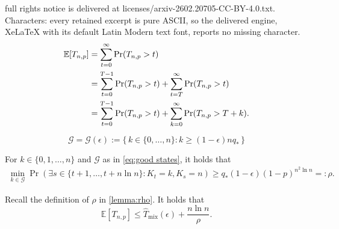 \documentclass[10pt,a4paper]{amsart}
\newcommand{\E}{\mathbb{E}}
\newcommand{\Tmar}{\hat{T}_{\mathrm{mix}}}
\begin{document}
full rights notice is delivered at licenses/arxiv-2602.20705-CC-BY-4.0.txt. Characters: every retained excerpt is pure ASCII, so the delivered engine, XeLaTeX with its default Latin Modern text font, reports no missing character.
\begin{align}
    \E[T_{n,p}] &= \sum_{t=0}^{\infty} \Pr(T_{n,p} > t) \notag\\
    &= \sum_{t=0}^{T-1} \Pr(T_{n,p} > t) + \sum_{t=T}^{\infty} \Pr(T_{n,p} > t) \notag\\
    &= \sum_{t=0}^{T-1} \Pr(T_{n,p} > t) + \sum_{k=0}^{\infty} \Pr(T_{n,p} > T+k).
    \label{eq: E[T_np] split}
\end{align}

\begin{equation}\label{eq:good states}
    \mathcal{G} = \mathcal{G}(\epsilon) := \{\, k \in \{0,\dots,n\} : k \ge (1-\epsilon) n q_* \,\}
\end{equation}

\begin{lemma}\label{lemma:rho}
For $k \in \{0,1,\ldots,n\}$ and $\mathcal{G}$ as in \cref{eq:good states}, it holds that
\begin{align*}
    \min_{k \in \mathcal{G}} \Pr( \exists s \in \{t+1,\ldots,t + n \ln n\} : K_t = k, K_s = n )
    \ge q_* (1-\epsilon) (1-p)^{n^2 \ln n} =: \rho.
\end{align*}
\end{lemma}

\begin{proposition}\label{prop:unconditional upper bound E[Tnp]}
Recall the definition of $\rho$ in \cref{lemma:rho}.
It holds that
\[
    \E[T_{n,p}] \le \Tmar(\epsilon) + \frac{n \ln n}{\rho}.
\]
\end{proposition}
\end{document}
